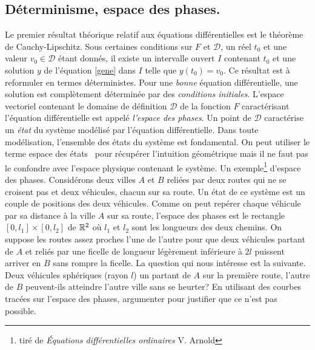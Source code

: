 \subsection{Déterminisme, espace des phases.}
Le premier résultat théorique relatif aux équations différentielles est le théorème de Cauchy-Lipschitz. Sous certaines conditions sur $F$ et $\mathcal{D}$, un réel $t_0$ et une valeur $v_0\in \mathcal{D}$ étant donnés, il existe un intervalle ouvert $I$ contenant $t_0$ et une solution $y$ de l'équation \eqref{gene} dans $I$ telle que $y(t_0)=v_0$.\newline
Ce résultat est à reformuler en termes déterministes. Pour une \emph{bonne} équation différentielle, une solution est complètement déterminée par des \emph{conditions initiales}.\newline
L'espace vectoriel contenant le domaine de définition $\mathcal{D}$ de la fonction $F$ caractérisant l'équation différentielle est appelé \emph{l'espace des phases}. Un point de $\mathcal{D}$ caractérise un \emph{état} du système modélisé par l'équation différentielle.\newline
Dans toute modélisation, l'ensemble des états du système est fondamental. On peut utiliser le terme \og espace des états\fg ~ pour récupérer l'intuition géométrique mais il ne faut pas le confondre avec l'espace physique contenant le système.\newline
Un exemple\footnote{tiré de \emph{\'Equations différentielles ordinaires} V. Arnold} d'espace des phases.\newline
Considérons deux villes $A$ et $B$ reliées par deux routes qui ne se croisent pas et deux véhicules, chacun sur sa route. Un état de ce système est un couple de positions des deux véhicules. Comme on peut repérer chaque véhicule par sa distance à la ville $A$ sur sa route, l'espace des phases est le rectangle $[0,l_1]\times[0,l_2]$ de $\mathbb{R}^2$ où $l_1$ et $l_2$ sont les longueurs des deux chemins.\newline
On suppose les routes assez proches l'une de l'autre pour que deux véhicules partant de $A$ et reliés par une ficelle de longueur légèrement inférieure à $2l$ puissent arriver en $B$ sans rompre la ficelle. La question qui nous intéresse est la suivante.\newline
Deux véhicules sphériques (rayon $l$) un partant de $A$ sur la première route, l'autre de $B$ peuvent-ils atteindre l'autre ville sans se heurter?\newline
En utilisant des courbes tracées sur l'espace des phases, argumenter pour justifier que ce n'est pas possible.

